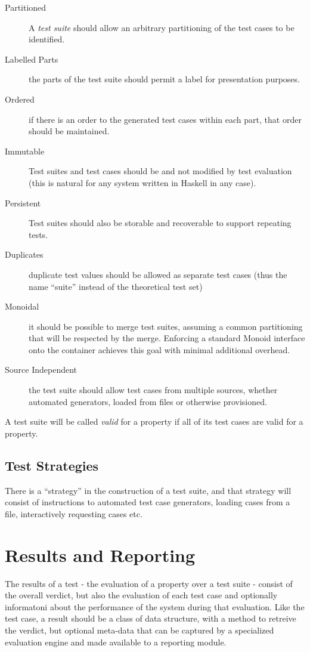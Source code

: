 \begin{description}
\item[Partitioned] A \emph{test suite} should allow an arbitrary partitioning of the test cases to be identified.
\item[Labelled Parts] the parts of the test suite should permit a label for presentation purposes.
\item[Ordered] if there is an order to the generated test cases within each part, that order should be maintained.
\item[Immutable] Test suites and test cases should be 
and not modified by test evaluation
(this is natural for any system written in Haskell in any case).
\item[Persistent]Test suites should also be storable and recoverable to support repeating tests.
\item[Duplicates] duplicate test values should be allowed as separate test cases
(thus the name ``suite'' instead of the theoretical test set)
\item[Monoidal] it should be possible to merge test suites, 
assuming a common partitioning that will be respected by the merge.
Enforcing a standard Monoid interface onto the container achieves this goal with minimal additional overhead.
\item[Source Independent] the test suite should allow test cases from multiple sources,
whether automated generators, loaded from files or otherwise provisioned.
\end{description}

A test suite will be called \emph{valid} for a property if all of its test cases are valid for a property.


\subsection{Test Strategies}
There is a ``strategy'' in the construction of a test suite,
and that strategy will consist of instructions to automated test case generators,
loading cases from a file, interactively requesting cases etc.


\section{Results and Reporting}
The results of a test - the evaluation of a property over a test suite - consist of the overall verdict,
but also the evaluation of each test case 
and optionally informatoni about the performance of the system during that evaluation.
Like the test case,
a result should be a class of data structure,
with a method to retreive the verdict,
but optional meta-data that can be captured by a specialized evaluation engine
and made available to a reporting module.

